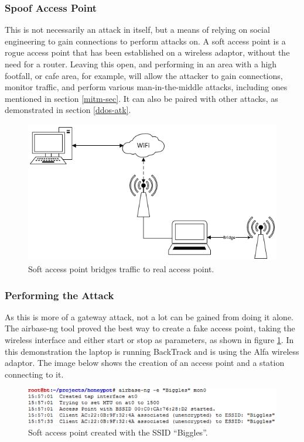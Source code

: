 \subsubsection{Spoof Access Point}
\label{sec:spoofap}
This is not necessarily an attack in itself, but a means of relying on social engineering to gain connections to perform attacks on. A soft access point is a rogue access point that has been established on a wireless adaptor, without the need for a router. Leaving this open, and performing in an area with a high footfall, or cafe area, for example, will allow the attacker to gain connections, monitor traffic, and perform various man-in-the-middle attacks, including ones mentioned in section \ref{mitm-sec}. It can also be paired with other attacks, as demonstrated in section \ref{ddos-atk}.

\begin{figure}[h!]
\includegraphics[width=\linewidth]{research/figures/spoofap.png}
\caption{Soft access point bridges traffic to real access point.}
\end{figure}

\subsubsection*{Performing the Attack}
As this is more of a gateway attack, not a lot can be gained from doing it alone. The airbase-ng tool proved the best way to create a fake access point, taking the wireless interface and either start or stop as parameters, as shown in figure \ref{ssid-demo-sec}. In this demonstration the laptop is running BackTrack and is using the Alfa wireless adaptor. The image below shows the creation of an access point and a station connecting to it.

\begin{figure}[h!]
\includegraphics[width=\linewidth]{research/attackvectors/figures/spoofap1.png}
\caption{Soft access point created with the SSID “Biggles”.}
\label{ssid-demo-sec}
\end{figure}